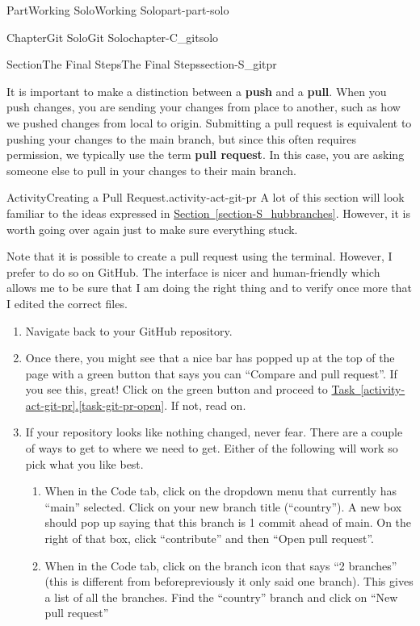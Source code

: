 \documentclass[oneside,10pt,]{book}
\newcommand{\xreffont}{\relax}
\newcommand{\terminology}[1]{\textbf{#1}}
\begin{document}
\begin{partptx}{Part}{Working Solo}{}{Working Solo}{}{}{part-part-solo}
\begin{chapterptx}{Chapter}{Git Solo}{}{Git Solo}{}{}{chapter-C_gitsolo}
\begin{sectionptx}{Section}{The Final Steps}{}{The Final Steps}{}{}{section-S_gitpr}
\par
It is important to make a distinction between a \terminology{push} and a \terminology{pull}. When you push changes, you are sending your changes from place to another, such as how we pushed changes from local to origin. Submitting a pull request is equivalent to pushing your changes to the main branch, but since this often requires permission, we typically use the term \terminology{pull request}. In this case, you are asking someone else to pull in your changes to their main branch.%
\begin{activity}{Activity}{Creating a Pull Request.}{activity-act-git-pr}%
%
A lot of this section will look familiar to the ideas expressed in \hyperref[section-S_hubbranches]{Section~{\xreffont\ref{section-S_hubbranches}}}. However, it is worth going over again just to make sure everything stuck.%
\par
Note that it is possible to create a pull request using the terminal. However, I prefer to do so on GitHub. The interface is nicer and human-friendly which allows me to be sure that I am doing the right thing and to verify once more that I edited the correct files.%
\begin{enumerate}[font=\bfseries,label=(\alph*),ref=\alph*]%
\item{}Navigate back to your GitHub repository.%
\item{}Once there, you might see that a nice bar has popped up at the top of the page with a green button that says you can ``Compare and pull request''. If you see this, great! Click on the green button and proceed to \hyperref[task-git-pr-open]{Task~{\xreffont\ref{activity-act-git-pr}}.{\xreffont\ref{task-git-pr-open}}}. If not, read on.%
\item\label{task-git-pr-create}If your repository looks like nothing changed, never fear. There are a couple of ways to get to where we need to get. Either of the following will work so pick what you like best.%
\begin{enumerate}
\item{}When in the Code tab, click on the dropdown menu that currently has ``main'' selected. Click on your new branch title (``country''). A new box should pop up saying that this branch is 1 commit ahead of main. On the right of that box, click ``contribute'' and then ``Open pull request''.%
\item{}When in the Code tab, click on the branch icon that says ``2 branches'' (this is different from before\textellipsis{}previously it only said one branch). This gives a list of all the branches. Find the ``country'' branch and click on ``New pull request''%

\end{enumerate}
\end{enumerate}
\end{activity}
\end{sectionptx}
\end{chapterptx}
\end{partptx}
\end{document}
